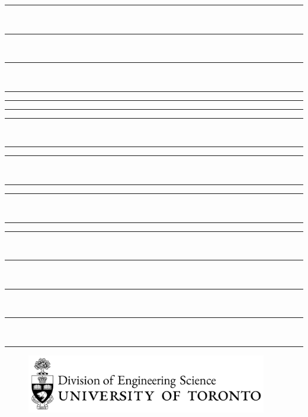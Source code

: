 {\begin{titlepage}
        \begin{spacing}{0.4}
        \begin{flushright}
        \rule{3.25cm}{0.3pt}\\
        \rule{3.25cm}{0.3pt}\\
        \rule{3.25cm}{0.3pt}\\
        \rule{3.25cm}{0.3pt}
        \end{flushright}
        \vspace{-2\baselineskip}
        \rule{\textwidth}{0.3pt} 
        \rule{3.25cm}{0.3pt} \hspace{\textwidth-6.75cm} \rule{3.25cm}{0.3pt}\\
        \rule{3.25cm}{0.3pt} \hspace{\textwidth-6.75cm} \rule{3.25cm}{0.3pt}\\
        \rule{3.25cm}{0.3pt} \hspace{\textwidth-6.75cm} \rule{3.25cm}{0.3pt}\\
        \rule{3.25cm}{0.3pt} \hspace{\textwidth-6.75cm} \rule{3.25cm}{0.3pt}\\
        \rule{3.25cm}{0.3pt}\\
        \rule{3.25cm}{0.3pt}\\
        \rule{3.25cm}{0.3pt}\\
        \rule{3.25cm}{0.3pt}
        \vspace{2.5\baselineskip}
        \end{spacing}
        \begin{figure}[H]
            \includegraphics[width=10.5cm]{assets/div_engsci_logo.pdf}
        \end{figure}
    \end{titlepage}
}
\makeatother